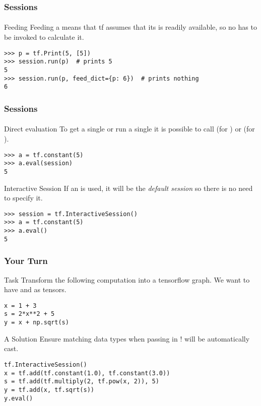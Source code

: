 \begin{frame}[fragile]
    \frametitle{Sessions}
    \framesubtitle{}
    \begin{block}{Feeding}
        Feeding a  means that tf assumes that its  is readily available, so no 
         has to be invoked to calculate it. 
        \begin{lstlisting}
>>> p = tf.Print(5, [5])
>>> session.run(p)  # prints 5
5
>>> session.run(p, feed_dict={p: 6})  # prints nothing
6
        \end{lstlisting}
    \end{block}
\end{frame}

\begin{frame}[fragile]
    \frametitle{Sessions}
    \framesubtitle{}
    \begin{block}{Direct evaluation}
        To get a single  or run a single  it is possible to 
        call  (for ) or  (for ).
        \begin{lstlisting}
>>> a = tf.constant(5)
>>> a.eval(session)
5
        \end{lstlisting}
    \end{block}
    \pause
    \begin{block}{Interactive Session}
        If an  is used, it will be the \emph{default session} so there is no need to specify it.
        \begin{lstlisting}
>>> session = tf.InteractiveSession()
>>> a = tf.constant(5)
>>> a.eval()
5
        \end{lstlisting}
    \end{block}
\end{frame}

\begin{frame}[fragile]
    \frametitle{Your Turn}
    \begin{block}{Task}
        Transform the following computation into a tensorflow graph. We want to have  and  as tensors.
    \begin{lstlisting}
x = 1 + 3
s = 2*x**2 + 5
y = x + np.sqrt(s)
    \end{lstlisting}
    \end{block}
    \pause
    \begin{block}{A Solution}
    Ensure matching data types when passing in ! 
     will be automatically cast.
    \begin{lstlisting}
tf.InteractiveSession()
x = tf.add(tf.constant(1.0), tf.constant(3.0))
s = tf.add(tf.multiply(2, tf.pow(x, 2)), 5)
y = tf.add(x, tf.sqrt(s))
y.eval()
    \end{lstlisting}        
    \end{block}
\end{frame}

